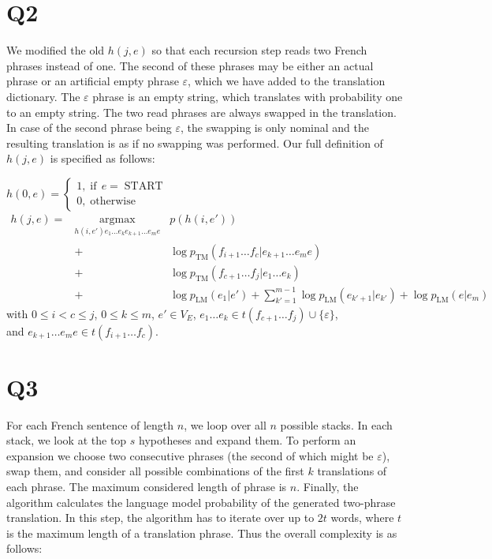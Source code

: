 \documentclass[11pt]{article}
\newcommand{\nocomma}{}
\newcommand{\noplus}{}
\newcommand{\tmop}[1]{\ensuremath{\operatorname{#1}}}
\newcommand{\upl}{+}
\begin{document}
\section*{Q2}
We modified the old $h(j,e)$ so that each recursion step reads two French phrases
instead of one. The second of these phrases may be either an actual phrase or an artificial  empty phrase $\varepsilon$, which we have added to the translation dictionary. The $\varepsilon$ phrase is an empty string, which translates with probability one to an empty string. The two read phrases are always swapped in the translation. In case of the second phrase being $\varepsilon$, the swapping is only nominal and the resulting translation is as if no swapping was performed.
Our full definition of $h(j,e)$ is specified as follows:

$h (0 \nocomma, e) = \left\{ \begin{array}{l}
1 \nocomma, \tmop{if} \, e = \tmop{START}\\
0 \nocomma, \tmop{otherwise}
\end{array} \right.$
\begin{eqnarray}
h (j, e) = & \underset{h (i, e') e_1 \ldots e_k e_{k + 1} \ldots e_m
	e}{\tmop{argmax}}_{} & p (h (i, e')) \nonumber\\
& + & \log p_{\tmop{TM}} (f_{i + 1} \ldots f_c |e_{k + 1} \ldots e_m e)
\nonumber\\
& \noplus + & \log p_{\tmop{TM}} (f_{c + 1} \ldots f_j |e_1 \ldots e_k)
\nonumber\\
& \upl & \log p_{\tmop{LM}} (e_1 |e') + \sum_{k' = 1}^{m - 1} \log
p_{\tmop{LM}} (e_{k' + 1} |e_{k'}) + \log p_{\tmop{LM}} (e|e_m) \nonumber
\end{eqnarray}
with $0 \leq i < c \leq j$, $0 \leq k \leq m$, $e' \in V_E$, $e_1 \ldots e_k
\in t (f_{c + 1} \ldots f_j) \cup \{ \varepsilon \}$,\\
and $e_{k + 1} \ldots e_m e \in t (f_{i + 1} \ldots f_c)$.



\section*{Q3}
For each French sentence of length $n$, we loop over all $n$ possible stacks. In each stack, we look at the top $s$ hypotheses and expand them. To perform an expansion we choose two consecutive phrases (the second of which might be $\varepsilon$), swap them, and consider all possible combinations of the first $k$ translations of each phrase. The maximum considered length of phrase is $n$. Finally, the algorithm calculates the language model probability of the generated two-phrase translation. In this step, the algorithm has to iterate over up to $2 t$ words, where $t$ is the maximum length of a translation phrase. Thus the overall complexity is as follows:
\end{document}
